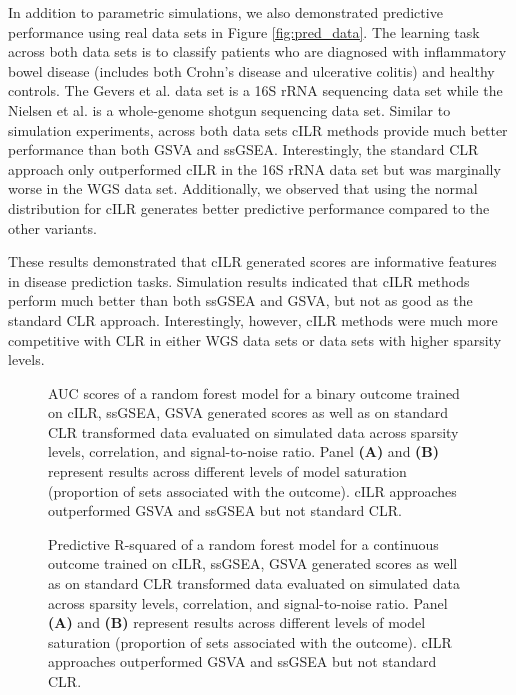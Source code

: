 \documentclass[10pt,letterpaper]{article}
\begin{document}
In addition to parametric simulations, we also demonstrated predictive performance using real data sets in Figure \ref{fig:pred_data}. The learning task across both data sets is to classify patients who are diagnosed with inflammatory bowel disease (includes both Crohn's disease and ulcerative colitis) and healthy controls. The Gevers et al. \cite{gevers2014} data set is a 16S rRNA sequencing data set while the Nielsen et al. \cite{nielsen2014} is a whole-genome shotgun sequencing data set. Similar to simulation experiments, across both data sets cILR methods provide much better performance than both GSVA and ssGSEA. Interestingly, the standard CLR approach only outperformed cILR in the 16S rRNA data set but was marginally worse in the WGS data set. Additionally, we observed that using the normal distribution for cILR generates better predictive performance compared to the other variants. 

These results demonstrated that cILR generated scores are informative features in disease prediction tasks. Simulation results indicated that cILR methods perform much better than both ssGSEA and GSVA, but not as good as the standard CLR approach. Interestingly, however, cILR methods were much more competitive with CLR in either WGS data sets or data sets with higher sparsity levels. 

\begin{figure}
    \caption{AUC scores of a random forest model for a binary outcome trained on cILR, ssGSEA, GSVA generated scores as well as on standard CLR transformed data evaluated on simulated data across sparsity levels, correlation, and signal-to-noise ratio. Panel \textbf{(A)} and \textbf{(B)} represent results across different levels of model saturation (proportion of sets associated with the outcome). cILR approaches outperformed GSVA and ssGSEA but not standard CLR.}
    \label{fig:sim_pred_auc}
\end{figure}

\begin{figure}
    \caption{Predictive R-squared of a random forest model for a continuous outcome trained on cILR, ssGSEA, GSVA generated scores as well as on standard CLR transformed data evaluated on simulated data across sparsity levels, correlation, and signal-to-noise ratio. Panel \textbf{(A)} and \textbf{(B)} represent results across different levels of model saturation (proportion of sets associated with the outcome). cILR approaches outperformed GSVA and ssGSEA but not standard CLR.}
    \label{fig:sim_pred_rsq}
\end{figure}
\end{document}
